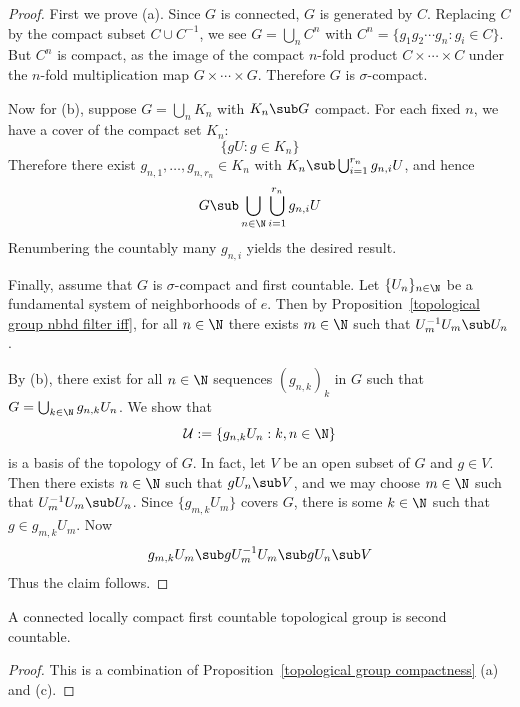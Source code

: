 \begin{proof}
First we prove (a). Since $G$ is connected, $G$ is generated by $C$. Replacing $C$ by the compact subset $C\cup C^{-1}$, we see $G=\bigcup_nC^n$ with $C^n=\{g_1g_2\cdots g_n:g_i\in C\}$. But $C^n$ is compact, as the image of the compact $n$-fold product $C\times\cdots\times C$ under the $n$-fold multiplication map $G\times\cdots\times G$. Therefore $G$ is $\sigma$-compact.\par
Now for (b), suppose $G=\bigcup_nK_n$ with $K_n\sub G$ compact. For each fixed $n$, we have a cover of the compact set $K_n$:
\[\{gU:g\in K_n\}\] 
Therefore there exist $g_{n,1},\dots,g_{n,r_n}\in K_n$ with $K_n\sub\bigcup_{i=1}^{r_n}g_{n,i}U$, and hence
\[G\sub\bigcup_{n\in\N}\bigcup_{i=1}^{r_n}g_{n,i}U\] 
Renumbering the countably many $g_{n,i}$ yields the desired result.\par
Finally, assume that $G$ is $\sigma$-compact and first countable. Let $\{U_n\}_{n\in\N}$ be a fundamental system of neighborhoods of $e$. Then by 
Proposition~\ref{topological group nbhd filter iff}, for all $n\in\N$ there exists $m\in\N$ such that $U^{-1}_mU_m\sub U_n$.\par 
By (b), there exist for all $n\in\N$ sequences $(g_{n,k})_k$ in $G$ such that $G=\bigcup_{k\in\N}g_{n,k}U_n$. We show that 
\[\mathcal{U}:=\{g_{n,k}U_n:k,n\in\N\}\]
is a basis of the topology of $G$. In fact, let $V$ be an open subset of $G$ and $g\in V$. Then there exists $n\in\N$ such that $gU_n\sub V$, and we may choose $m\in\N$ such that $U^{-1}_mU_m\sub U_n$. Since $\{g_{m,k}U_m\}$ covers $G$, there is some $k\in\N$ such that $g\in g_{m,k}U_m$. Now
\[g_{m,k}U_m\sub gU_m^{-1}U_m\sub gU_n\sub V\]
Thus the claim follows.
\end{proof}
\begin{corollary}
A connected locally compact first countable topological group is second countable.
\end{corollary}
\begin{proof}
This is a combination of Proposition~\ref{topological group compactness} (a) and (c).
\end{proof}
